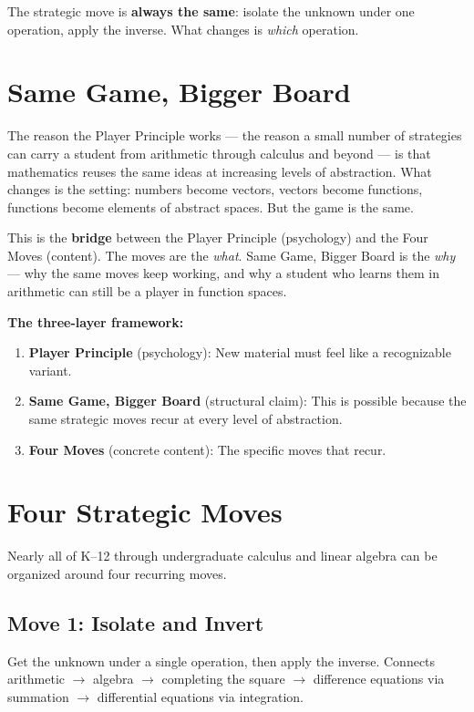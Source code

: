 \documentclass[11pt]{article}
\begin{document}
The strategic move is \textbf{always the same}: isolate the unknown under one operation, apply the inverse. What changes is \emph{which} operation.

\section{Same Game, Bigger Board}

The reason the Player Principle works --- the reason a small number of strategies can carry a student from arithmetic through calculus and beyond --- is that mathematics reuses the same ideas at increasing levels of abstraction. What changes is the setting: numbers become vectors, vectors become functions, functions become elements of abstract spaces. But the game is the same.

This is the \textbf{bridge} between the Player Principle (psychology) and the Four Moves (content). The moves are the \emph{what}. Same Game, Bigger Board is the \emph{why} --- why the same moves keep working, and why a student who learns them in arithmetic can still be a player in function spaces.

\textbf{The three-layer framework:}

\begin{enumerate}
  \item \textbf{Player Principle} (psychology): New material must feel like a recognizable variant.
  \item \textbf{Same Game, Bigger Board} (structural claim): This is possible because the same strategic moves recur at every level of abstraction.
  \item \textbf{Four Moves} (concrete content): The specific moves that recur.
\end{enumerate}

\section{Four Strategic Moves}

Nearly all of K--12 through undergraduate calculus and linear algebra can be organized around four recurring moves.

\subsection{Move 1: Isolate and Invert}

Get the unknown under a single operation, then apply the inverse. Connects arithmetic $\rightarrow$ algebra $\rightarrow$ completing the square $\rightarrow$ difference equations via summation $\rightarrow$ differential equations via integration.
\end{document}
